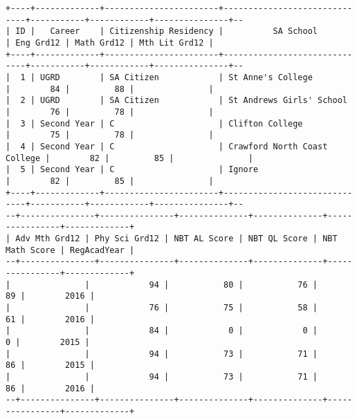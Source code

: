 \begin{sidewaysfigure}
    \centering
    \begin{mdframed}[topline=false,rightline=false,leftline=false]
        \centering
        \begin{BVerbatim}
+----+-------------+-----------------------+------------------------------+-----------+------------+---------------+--
| ID |   Career    | Citizenship Residency |          SA School           | Eng Grd12 | Math Grd12 | Mth Lit Grd12 |
+----+-------------+-----------------------+------------------------------+-----------+------------+---------------+--
|  1 | UGRD        | SA Citizen            | St Anne's College            |        84 |         88 |               |
|  2 | UGRD        | SA Citizen            | St Andrews Girls' School     |        76 |         78 |               |
|  3 | Second Year | C                     | Clifton College              |        75 |         78 |               |
|  4 | Second Year | C                     | Crawford North Coast College |        82 |         85 |               |
|  5 | Second Year | C                     | Ignore                       |        82 |         85 |               |
+----+-------------+-----------------------+------------------------------+-----------+------------+---------------+--
--+---------------+---------------+--------------+--------------+----------------+-------------+
| Adv Mth Grd12 | Phy Sci Grd12 | NBT AL Score | NBT QL Score | NBT Math Score | RegAcadYear |
--+---------------+---------------+--------------+--------------+----------------+-------------+
|               |            94 |           80 |           76 |             89 |        2016 |
|               |            76 |           75 |           58 |             61 |        2016 |
|               |            84 |            0 |            0 |              0 |        2015 |
|               |            94 |           73 |           71 |             86 |        2015 |
|               |            94 |           73 |           71 |             86 |        2016 |
--+---------------+---------------+--------------+--------------+----------------+-------------+
        \end{BVerbatim}
    \end{mdframed}
    \caption[Admissions data sample]{\textbf{Figure \ref{fig-sample-admissions}: Admissions data sample}}
    \label{fig-sample-admissions}
\end{sidewaysfigure}
